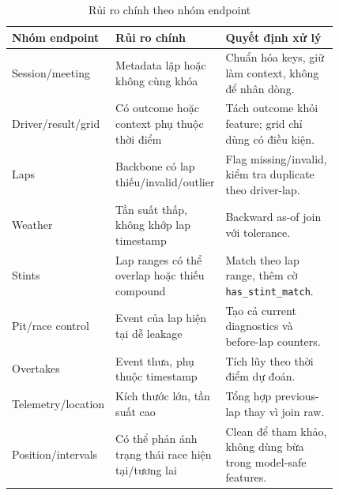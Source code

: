 \documentclass[conference]{IEEEtran}
\begin{document}
\begin{table}[htbp]
\caption{Rủi ro chính theo nhóm endpoint}
\label{tab:riskbyendpoint}
\centering
\begin{tabular}{p{0.16\linewidth}p{0.22\linewidth}p{0.44\linewidth}}
\toprule
Nhóm endpoint & Rủi ro chính & Quyết định xử lý \\
\midrule
Session/meeting & Metadata lặp hoặc không cùng khóa & Chuẩn hóa keys, giữ làm context, không để nhân dòng. \\
Driver/result/grid & Có outcome hoặc context phụ thuộc thời điểm & Tách outcome khỏi feature; grid chỉ dùng có điều kiện. \\
Laps & Backbone có lap thiếu/invalid/outlier & Flag missing/invalid, kiểm tra duplicate theo driver-lap. \\
Weather & Tần suất thấp, không khớp lap timestamp & Backward as-of join với tolerance. \\
Stints & Lap ranges có thể overlap hoặc thiếu compound & Match theo lap range, thêm cờ \texttt{has\_stint\_match}. \\
Pit/race control & Event của lap hiện tại dễ leakage & Tạo cả current diagnostics và before-lap counters. \\
Overtakes & Event thưa, phụ thuộc timestamp & Tích lũy theo thời điểm dự đoán. \\
Telemetry/location & Kích thước lớn, tần suất cao & Tổng hợp previous-lap thay vì join raw. \\
Position/intervals & Có thể phản ánh trạng thái race hiện tại/tương lai & Clean để tham khảo, không dùng bừa trong model-safe features. \\
\bottomrule
\end{tabular}
\end{table}
\end{document}
